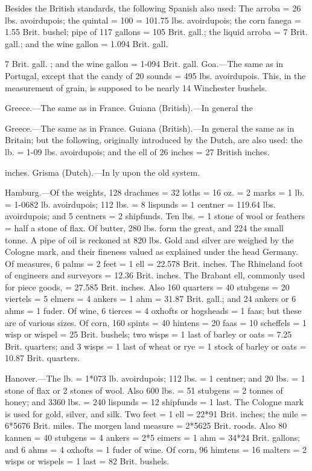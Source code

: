 \documentclass{article}
\begin{document}
Besides the British standards, the following Spanish also used: The arroba = 26 lbs. avoirdupois; the quintal = 100 = 101.75 lbs. avoirdupois; the corn fanega = 1.55 Brit. bushel; pipe of 117 gallons = 105 Brit. gall.; the liquid arroba = 7 Brit. gall.; and the wine gallon = 1.094 Brit. gall.

7 Brit. gall. ; and the wine gallon = 1-094 Brit. gall.
Goa.—The same as in Portugal, except that the candy of 20
sounds = 495 lbs. avoirdupois. This, in the measurement of grain, is
supposed to be nearly 14 Winchester bushels.

Greece.—The same as in France.
Guiana (British).—In general the

Greece.—The same as in France.
Guiana (British).—In general the same as in Britain; but the following, originally introduced by the Dutch, are also used: the lb. = 1-09 lbs. avoirdupois; and the ell of 26 inches = 27 British inches.

inches.
Grisma (Dutch).—In
ly upon the old system.

Hamburg.—Of the weights, 128 drachmes = 32 loths = 16 oz. = 2 marks = 1 lb. = 1-0682 lb. avoirdupois; 112 lbs. = 8 lispunds = 1 centner = 119.64 lbs. avoirdupois; and 5 centners = 2 shipfunds. Ten lbs. = 1 stone of wool or feathers = half a stone of flax. Of butter, 280 lbs. form the great, and 224 the small tonne. A pipe of oil is reckoned at 820 lbs. Gold and silver are weighed by the Cologne mark, and their fineness valued as explained under the head Germany. Of measures, 6 palms = 2 feet = 1 ell = 22.578 Brit. inches. The Rhineland foot of engineers and surveyors = 12.36 Brit. inches. The Brabant ell, commonly used for piece goods, = 27.585 Brit. inches. Also 160 quarters = 40 stubgens = 20 viertels = 5 elmers = 4 ankers = 1 ahm = 31.87 Brit. gall.; and 24 ankers or 6 ahms = 1 fuder. Of wine, 6 tierces = 4 oxhofts or hogsheads = 1 faas; but these are of various sizes. Of corn, 160 spints = 40 hintens = 20 faas = 10 scheffels = 1 wisp or wispel = 25 Brit. bushels; two wisps = 1 last of barley or oats = 7.25 Brit. quarters; and 3 wisps = 1 last of wheat or rye = 1 stock of barley or oats = 10.87 Brit. quarters.

Hanover.—The lb. = 1*073 lb. avoirdupois; 112 lbs. = 1 centner; and 20 lbs. = 1 stone of flax or 2 stones of wool. Also 600 lbs. = 51 stubgens = 2 tonnes of honey; and 3360 lbs. = 240 lispunds = 12 shipfunds = 1 last. The Cologne mark is used for gold, silver, and silk. Two feet = 1 ell = 22*91 Brit. inches; the mile = 6*5676 Brit. miles. The morgen land measure = 2*5625 Brit. roods. Also 80 kannen = 40 stubgens = 4 ankers = 2*5 eimers = 1 ahm = 34*24 Brit. gallons; and 6 ahms = 4 oxhofts = 1 fuder of wine. Of corn, 96 himtens = 16 malters = 2 wisps or wispels = 1 last = 82 Brit. bushels.
\end{document}
